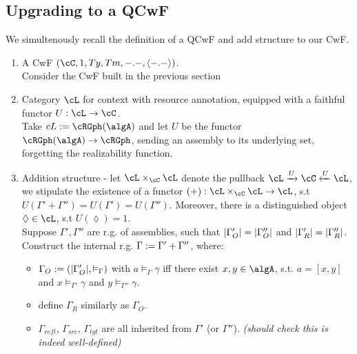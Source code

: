 \documentclass[12pt,a4paper]{article}
\def\src{_{src}}\alwaysmath{src}
\def\rfl{_{refl}}\alwaysmath{rfl}
\def\tgt{_{tgt}}\alwaysmath{tgt}
\renewcommand{\O}{_{O}}\alwaysmath{O}
\def\R{_{R}}\alwaysmath{R}
\begin{document}
\subsection*{Upgrading to a QCwF}
We simultenously recall the definition of a QCwF and add structure to our CwF.
\begin{enumerate}[noitemsep]
  \item A CwF $(\cC, 1, Ty, Tm, -.-, \langle-.-\rangle)$.\\
  Consider the CwF built in the previous section
  
  \item Category $\cL$ for context with resource annotation, equipped with a faithful functor $U: \cL \to \cC$.\\
  Take $cL := \cRGph(\algA)$ and let $U$ be the functor $\cRGph(\algA) \to \cRGph$, sending an assembly to its underlying set, forgetting the realizability function.
  
  \item Addition structure - let $\cL \times_\cC \cL$ denote the pullback $\cL \xrightarrow{U} \cC \xleftarrow{U} \cL$, we stipulate the existence of a functor $(+): \cL \times_\cC \cL \to \cL$, s.t $U(\Gamma' + \Gamma'')=U(\Gamma')=U(\Gamma'')$. Moreover, there is a distinguished object $\lozenge \in \cL$, s.t $U(\lozenge) = 1$.\\
  Suppose $\Gamma', \Gamma''$ are r.g. of assemblies, such that $\carr{\Gamma'\O}=\carr{\Gamma''\O}$ and $\carr{\Gamma'\R}=\carr{\Gamma''\R}$. Construct the internal r.g. $\Gamma := \Gamma' + \Gamma''$, where:
  \begin{itemize}[noitemsep]
    \item $\Gamma\O \define (\carr{\Gamma'\O}, \vDash_\Gamma)$ with $ a \vDash_\Gamma \gamma$ iff there exist $x,y \in \algA$, s.t. $a = [x,y]$ and $x \vDash_{\Gamma'} \gamma$ and $ y \vDash_{\Gamma''} \gamma$.
    \item define $\Gamma\R$ similarly as $\Gamma\O$.
    \item $\Gamma\rfl$, $\Gamma\src$, $\Gamma\tgt$ are all inherited from $\Gamma'$ (or $\Gamma''$). \textit{(should check this is indeed well-defined)}\\
    
    

\end{itemize}
\end{enumerate}
\end{document}

